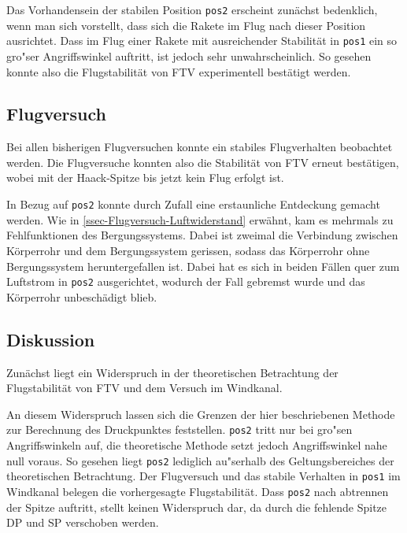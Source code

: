 \documentclass[10pt,a4paper]{article}
\begin{document}
Das Vorhandensein der stabilen Position \texttt{pos2} erscheint zunächst bedenklich, wenn man sich vorstellt, dass sich die Rakete im Flug nach dieser Position ausrichtet. Dass im Flug einer Rakete mit ausreichender Stabilität in \texttt{pos1} ein so gro"ser Angriffswinkel auftritt, ist jedoch sehr unwahrscheinlich. So gesehen konnte also die Flugstabilität von FTV experimentell bestätigt werden.


\subsection{Flugversuch}
\label{ssec-Flugversuch-Stabilität}

Bei allen bisherigen Flugversuchen konnte ein stabiles Flugverhalten beobachtet werden. Die Flugversuche konnten also die Stabilität von FTV erneut bestätigen, wobei mit der Haack-Spitze bis jetzt kein Flug erfolgt ist. 

In Bezug auf \texttt{pos2} konnte durch Zufall eine erstaunliche Entdeckung gemacht werden. Wie in \ref{ssec-Flugversuch-Luftwiderstand} erwähnt, kam es mehrmals zu Fehlfunktionen des Bergungssystems. Dabei ist zweimal die Verbindung zwischen Körperrohr und dem Bergungssystem gerissen, sodass das Körperrohr ohne Bergungssystem heruntergefallen ist. Dabei hat es sich in beiden Fällen quer zum Luftstrom in \texttt{pos2} ausgerichtet, wodurch der Fall gebremst wurde und das Körperrohr unbeschädigt blieb. 


\subsection{Diskussion}

Zunächst liegt ein Widerspruch in der theoretischen Betrachtung der Flugstabilität von FTV und dem Versuch im Windkanal.

An diesem Widerspruch lassen sich die Grenzen der hier beschriebenen Methode zur Berechnung des Druckpunktes feststellen. \texttt{pos2} tritt nur bei gro"sen Angriffswinkeln auf, die theoretische Methode setzt jedoch Angriffswinkel nahe null voraus. So gesehen liegt \texttt{pos2} lediglich au"serhalb des Geltungsbereiches der theoretischen Betrachtung. Der Flugversuch und das stabile Verhalten in \texttt{pos1} im Windkanal belegen die vorhergesagte Flugstabilität. Dass \texttt{pos2} nach abtrennen der Spitze auftritt, stellt keinen Widerspruch dar, da durch die fehlende Spitze DP und SP verschoben werden.


\end{document}
